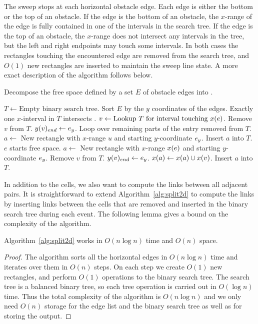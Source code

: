 \documentclass[english,gradu]{tktltiki2018}
\begin{document}
The sweep stops at each horizontal obstacle edge.
Each edge is either the bottom or the top of an obstacle.
If the edge is the bottom of an obstacle, the $x$-range of the edge is fully contained in one of the intervals in the search tree.
If the edge is the top of an obstacle, the $x$-range does not intersect any intervals in the tree, but the left and right endpoints may touch some intervals.
In both cases the rectangles touching the encountered edge are removed from the search tree, and $O(1)$ new rectangles are inserted to maintain the sweep line state.
A more exact description of the algorithm follows below.

\begin{alg}\label{alg:split2d}
Decompose the free space defined by a set $E$ of obstacle edges into .
\begin{algorithmic}
\State $T\gets \text{Empty binary search tree}$.
\State Sort $E$ by the $y$ coordinates of the edges.
		\Comment Exactly one $x$-interval in $T$ intersects .
		\State $v\gets\text{Lookup $T$ for interval touching \ensuremath{x(e)}}$.
		\State Remove $v$ from $T$.
		\State $y(v)_{end}\gets{e}_y$.
			\Comment Loop over remaining parts of the entry removed from $T$.
			\State $a\gets$ New rectangle with $x$-range $u$ and starting $y$-coordinate ${e}_y$.
			\State Insert $a$ into $T$.
		\EndFor
	\Else\Comment $e$ starts free space.
		\State $a\gets$ New rectangle with $x$-range $x(e)$ and starting $y$-coordinate ${e}_y$.
			\State Remove $v$ from $T$.
			\State $y(v)_{end}\gets{e}_y$.
			\State $x(a)\gets x(a)\cup x(v)$.
		\EndFor
		\State Insert $a$ into $T$.
	\EndIf
\EndFor
\end{algorithmic}
\end{alg}

In addition to the cells, we also want to compute the links between all adjacent pairs.
It is straightforward to extend Algorithm~\ref{alg:split2d} to compute the links by inserting links between the cells that are removed and inserted in the binary search tree during each event.
The following lemma gives a bound on the complexity of the algorithm.

\begin{lem}\label{lem:split2dtime}Algorithm~\ref{alg:split2d} works in $O(n\log n)$ time and $O(n)$ space.\end{lem}
\begin{proof}
The algorithm sorts all the horizontal edges in $O(n\log n)$ time and iterates over them in $O(n)$ steps.
On each step we create $O(1)$ new rectangles, and perform $O(1)$ operations to the binary search tree.
The search tree is a balanced binary tree, so each tree operation is carried out in $O(\log n)$ time.
Thus the total complexity of the algorithm is $O(n\log n)$ and we only need $O(n)$ storage for the edge list and the binary search tree as well as for storing the output.
\end{proof}
\end{document}
